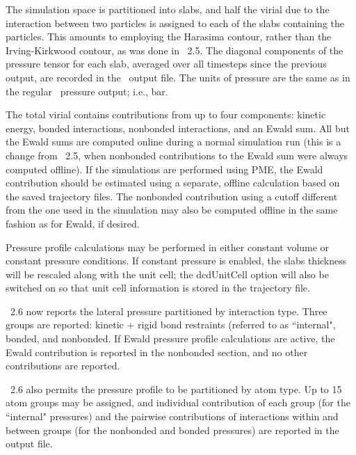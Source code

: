 The simulation space is partitioned into slabs, and half the virial
due to the interaction between two particles is assigned to each
of the slabs containing the particles.  This amounts to employing
the Harasima contour, rather than the Irving-Kirkwood contour, as
was done in \NAMD\ 2.5.  The diagonal components of the pressure
tensor for each slab, averaged over all timesteps since the previous
output, are recorded in the \NAMD\ output file.  The
units of pressure are the same as in the regular \NAMD\ pressure
output; i.e., bar.

The total virial contains contributions from up to four components: 
kinetic energy, bonded interactions, nonbonded interactions, and an Ewald
sum.  All but the Ewald sums are computed online during a normal simulation
run (this is a change from \NAMD\ 2.5, when nonbonded contributions to the
Ewald sum were always computed offline).  If the simulations are performed
using PME, the Ewald contribution should be estimated using a separate,
offline calculation based on the saved trajectory files.  The nonbonded
contribution using a cutoff different from the one used in the simulation
may also be computed offline in the same fashion as for Ewald, if desired.

Pressure profile calculations may be performed in either constant volume 
or constant pressure conditions.  If constant pressure is enabled, the
slabs thickness will be rescaled along with the unit cell; the dcdUnitCell
option will also be switched on so that unit cell information is stored in
the trajectory file.

\NAMD\ 2.6 now reports the lateral pressure partitioned by interaction type.
Three groups are reported: kinetic + rigid bond restraints (referred to as 
``internal", bonded, and nonbonded.  If Ewald pressure profile calculations
are active, the Ewald contribution is reported in the nonbonded section, and
no other contributions are reported.

\NAMD\ 2.6 also permits the pressure profile to be partitioned by atom type.
Up to 15 atom groups may be assigned, and individual contribution of each
group (for the ``internal" pressures) and the pairwise contributions of
interactions within and between groups (for the nonbonded and bonded pressures)
are reported in the output file.

